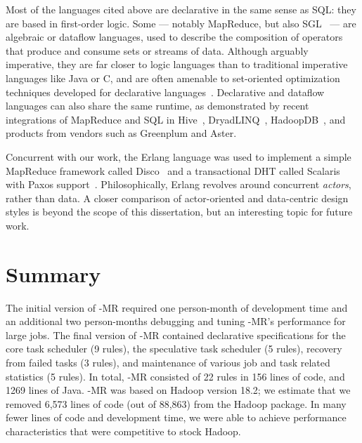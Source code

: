 Most of the languages cited above are declarative in the same sense as SQL: they are 
based in first-order logic. Some --- notably MapReduce, but also SGL~\cite{cornellgames} --- are
algebraic or dataflow languages, used to describe the composition of operators that produce and 
consume sets or streams of data.  Although arguably imperative, they are far closer to logic languages 
than to traditional imperative languages like Java or C, and are often amenable to set-oriented optimization 
techniques developed for declarative languages~\cite{cornellgames}. Declarative and dataflow languages 
can also share the same runtime, as demonstrated by recent integrations of MapReduce and SQL
in Hive~\cite{hive-vldb}, DryadLINQ~\cite{DryadLINQ}, HadoopDB~\cite{hadoopdb}, and products from vendors 
such as Greenplum and Aster.

Concurrent with our work, the Erlang language was used to implement a simple MapReduce framework called 
Disco~\cite{disco} and a transactional DHT called Scalaris with Paxos support~\cite{scalaris}. Philosophically, Erlang 
revolves around concurrent {\em actors}, rather than data. A closer comparison of actor-oriented and data-centric design 
styles is beyond the scope of this dissertation, but an interesting topic for future work.

\section{Summary}
\label{ch:boom:sec:conclusion}

The initial version of \BOOM-MR required one person-month of development time
and an additional two person-months debugging and tuning \BOOM-MR's performance
for large jobs.  The final version of \BOOM-MR contained declarative
specifications for the core task scheduler (9 rules), the speculative task
scheduler (5 rules), recovery from failed tasks (3 rules), and maintenance of
various job and task related statistics (5 rules).  In total, \BOOM-MR
consisted of 22 \OVERLOG rules in 156 lines of code, and 1269 lines of Java.
\BOOM-MR was based on Hadoop version 18.2; we estimate that we removed 6,573
lines of code (out of 88,863) from the  Hadoop
package.  In many fewer lines of code and development time, we were able to
achieve performance characteristics that were competitive to stock Hadoop.


